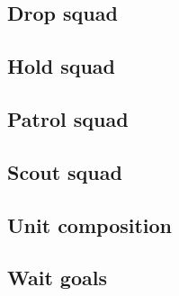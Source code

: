 \subsection{Drop squad}
\label{sec:drop_squad}

\subsection{Hold squad}
\label{sec:hold_squad}

\subsection{Patrol squad}
\label{sec:patrol_squad}

\subsection{Scout squad}
\label{sec:scout_squad}

\subsection{Unit composition}
\label{sec:unit_composition}

\subsection{Wait goals}
\label{sec:wait_goals}